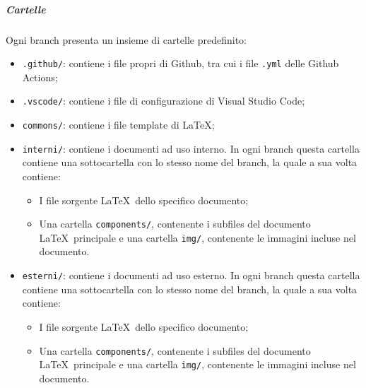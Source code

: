 \documentclass[../norme-di-progetto.tex]{subfiles}
\begin{document}
\subparagraph*{Cartelle}
Ogni branch presenta un insieme di cartelle predefinito:
\begin{itemize}
\item \texttt{.github/}: contiene i file propri di Github, tra cui i file \texttt{.yml} delle Github Actions;
  \item \texttt{.vscode/}: contiene i file di configurazione di Visual Studio Code;
  \item \texttt{commons/}: contiene i file template di \LaTeX;
  \item \texttt{interni/}: contiene i documenti ad uso interno. In ogni branch questa cartella contiene una sottocartella con lo stesso nome del branch, la quale a sua volta contiene:
  \begin{itemize}
  \item I file sorgente \LaTeX\ dello specifico documento;
  \item Una cartella \texttt{components/}, contenente i subfiles del documento \LaTeX\ principale e una cartella \texttt{img/}, contenente le immagini incluse nel documento.
  \end{itemize}
  \item \texttt{esterni/}: contiene i documenti ad uso esterno. In ogni branch questa cartella contiene una sottocartella con lo stesso nome del branch, la quale a sua volta contiene:
  \begin{itemize}
  \item I file sorgente \LaTeX\ dello specifico documento;
  \item Una cartella \texttt{components/}, contenente i subfiles del documento \LaTeX\ principale e una cartella \texttt{img/}, contenente le immagini incluse nel documento.
  \end{itemize}
\end{itemize}
\end{document}
